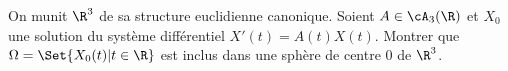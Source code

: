 \begin{enonce}
\begin{exercise}[ID={RMS134 E981},subtitle={Mines-Ponts PSI 2023},tags={oraux},difficulty={}]

  On munit $\R^3$ de sa structure euclidienne canonique.
  Soient $A\in\cA_3(\R)$ et $X_0$ une solution du système différentiel $X'(t) = A(t) X(t)$.
  Montrer que $\Omega = \Set{X_0(t) | t\in\R}$ est inclus dans une sphère de centre $0$ de $\R^3$.
\end{exercise}
\begin{solution}
\end{solution}
\end{enonce}
